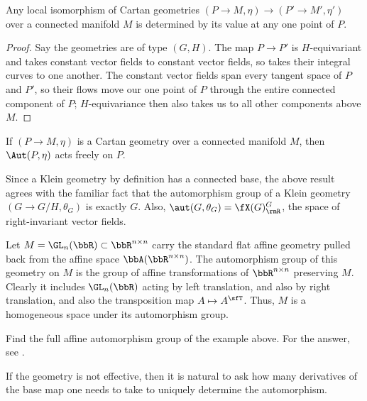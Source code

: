 \begin{thm}
    Any local isomorphism of Cartan geometries $(P\to M,\eta)\to (P'\to M',\eta')$ over a connected manifold $M$ is determined by its value at any one point of $P$.
\end{thm}
\begin{proof}
    Say the geometries are of type $(G,H)$. The map $P\to P'$ is $H$-equivariant and takes constant vector fields to constant vector fields, so takes their integral curves to one another. The constant vector fields span every tangent space of $P$ and $P'$, so their flows move our one point of $P$ through the entire connected component of $P$; $H$-equivariance then also takes us to all other components above $M$.
\end{proof}
\begin{cor}
    If $(P\to M,\eta)$ is a Cartan geometry over a connected manifold $M$, then $\Aut(P,\eta)$ acts freely on $P$.
\end{cor}

\begin{example}
    Since a Klein geometry by definition has a connected base, the above result agrees with the familiar fact that the automorphism group of a Klein geometry $(G\to G\slash H,\theta_G)$ is exactly $G$. Also, $\aut(G,\theta_G)=\fX(G)^G_\rmR$, the space of right-invariant vector fields.
\end{example}

\begin{example}
    Let $M=\GL_n(\bbR)\subset \bbR^{n\times n}$ carry the standard flat affine geometry pulled back from the affine space $\bbA(\bbR^{n\times n})$. The automorphism group of this geometry on $M$ is the group of affine transformations of $\bbR^{n\times n}$ preserving $M$. Clearly it includes $\GL_n(\bbR)$ acting by left translation, and also by right translation, and also the transposition map $A\mapsto A^\sfT $. Thus, $M$ is a homogeneous space under its automorphism group.
\end{example}

\begin{xca}
    Find the full affine automorphism group of the example above. For the answer, see \cite{Dieudonne}.
\end{xca}

If the geometry is not effective, then it is natural to ask how many derivatives of the base map one needs to take to uniquely determine the automorphism.

